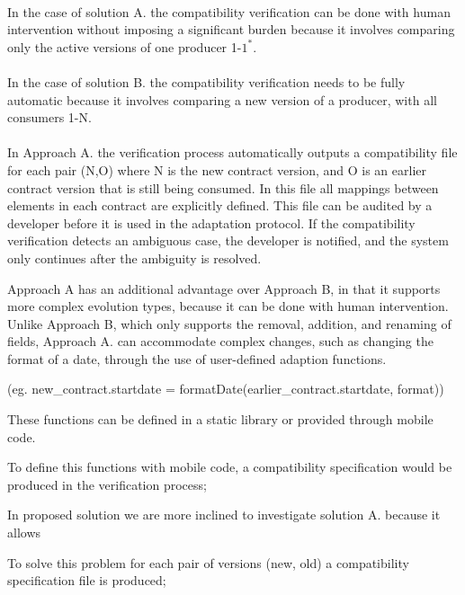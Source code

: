 \paragraph{}
In the case of solution A. the compatibility verification can be done with human intervention without imposing a significant burden
because it involves comparing only the active versions of one producer 1-$1^{\ast}$.

\paragraph{}
In the case of solution B. the compatibility verification needs to be fully automatic because it involves comparing a new version of a producer, with all consumers 1-N.

\paragraph{}

In Approach A. the verification process automatically outputs a compatibility file for each pair (N,O) where N is the new contract version,
and O is an earlier contract version that is still being consumed.
In this file all mappings between elements in each contract are explicitly defined.
This file can be audited by a developer before it is used in the adaptation protocol.
If the compatibility verification detects an ambiguous case, the developer is notified, and the system only continues after the ambiguity is resolved.

Approach A has an additional advantage over Approach B, in that it supports more complex evolution types, because it can be done with human intervention.
Unlike Approach B, which only supports the removal, addition,
and renaming of fields, Approach A. can accommodate complex changes,
such as changing the format of a date, through the use of user-defined adaption functions.

(eg. new\_contract.startdate = formatDate(earlier\_contract.startdate, format))

These functions can be defined in a static library or provided through mobile code.


To define this functions with mobile code, a compatibility specification would be produced in the verification process;

In proposed solution we are more inclined to investigate solution A. because it allows

To solve this problem for each pair of versions (new, old) a compatibility specification file is produced;

